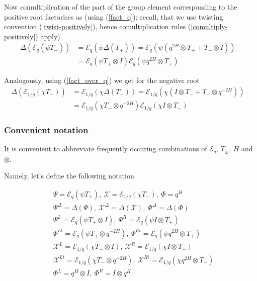 \documentclass{article}
\newcommand{\lb}{\left (}
\newcommand{\rb}{\right )}
\newcommand{\B}[1]{\lb #1 \rb}
\newcommand{\be}{\begin{eqnarray}}
\newcommand{\ee}{\end{eqnarray}}
\newcommand {\?}{\textit{???}}
\newcommand{\me}[0]{\mathcal{E}}
\newcommand{\Tp}[1][]{T_{+ #1}}
\newcommand{\Tm}[1][]{T_{- #1}}
\def\Chi{\mathcal{X}}
\newcommand{\EChiL}[1][]{\Chi^L_{#1}}
\newcommand{\EChiR}[1][]{\Chi^R_{#1}}
\newcommand{\EChiLT}[1][]{\Chi^{Lt}_{#1}}
\newcommand{\EChiRT}[1][]{\Chi^{Rt}_{#1}}
\newcommand{\EChiD}[1][]{\Chi^\Delta_{#1}}
\newcommand{\EPsiL}[1][]{\Psi^L_{#1}}
\newcommand{\EPsiR}[1][]{\Psi^R_{#1}}
\newcommand{\EPsiLT}[1][]{\Psi^{Lt}_{#1}}
\newcommand{\EPsiRT}[1][]{\Psi^{Rt}_{#1}}
\newcommand{\EPsiD}[1][]{\Psi^\Delta_{#1}}
\newcommand{\QPhiL}[1][]{\Phi^L_{#1}}
\newcommand{\QPhiR}[1][]{\Phi^R_{#1}}
\newcommand{\QPhiD}[1][]{\Phi^\Delta_{#1}}
\newcommand{\comul}[1]{\Delta \lb #1 \rb}
\newcommand{\delabel}[1]{(\ref{#1})}
\begin{document}
Now comultiplication of the part of the group element corresponding to the positive root factorises as
(using \delabel{fact_q}; recall, that we use twisting convention \delabel{twist-positively}, hence
comultiplication rules \delabel{comultiply-positively} apply)
\be
\label{comul-expt-positive-sl2}
\comul{\me_q \lb \psi T_+ \rb} & = \me_q \lb \psi \comul{T_+}\rb = \me_q \lb \psi \lb q^{2H} \otimes T_+ + T_+ \otimes I \rb \rb & \\
& = \me_q \lb \psi T_+ \otimes I\rb \me_q \lb \psi q^{2H} \otimes T_+\rb \nonumber
\ee

Analogously, using (\ref{fact_over_q}) we get for the negative root
\be
\label{comul-expt-negative-sl2}
\comul{\me_{1/q} \lb \chi T_- \rb} & = \me_{1/q} \lb \chi \comul{T_-}\rb = \me_{1/q} \lb \chi \lb I \otimes T_- + T_- \otimes q^{-2H} \rb \rb & \\
& = \me_{1/q} \lb \chi T_- \otimes q^{-2H}\rb \me_{1/q} \lb \chi I \otimes T_-\rb \nonumber
\ee

\subsubsection{Convenient notation}

It is convenient to abbreviate frequently occuring combinations of $\me_q$, $T_\pm$, $H$ and $\otimes$.

Namely, let's define the following notation

\be
& \Psi = \me_q \B{\psi \Tp},\ \Chi = \me_{1/q} \B{\chi \Tm},\ \Phi = q^H \nonumber \\
& \EPsiD = \comul{\Psi},\ \EChiD = \comul{\Chi},\ \QPhiD = \comul{\Phi} \nonumber \\
& \EPsiL = \me_q \lb \psi T_+ \otimes I\rb,\ \EPsiR = \me_q \lb \psi I \otimes T_+ \rb \nonumber \\
\label{macrolanguage-sl2}
& \EPsiLT = \me_q \lb \psi T_+ \otimes q^{-2H}\rb,\ \EPsiRT = \me_q \lb \psi q^{2H} \otimes T_+ \rb \\
& \EChiL = \me_{1/q} \lb \chi T_- \otimes I\rb,\ \EChiR = \me_{1/q} \lb \chi I \otimes T_- \rb \nonumber \\
& \EChiLT = \me_{1/q} \lb \chi T_- \otimes q^{-2H}\rb,\ \EChiRT = \me_{1/q} \lb \chi q^{2H} \otimes T_- \rb \nonumber \\
& \QPhiL = q^H \otimes I,\ \QPhiR = I \otimes q^H \nonumber 
\ee
\end{document}
